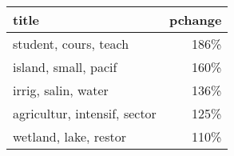 \begin{tabular}{p{1.2cm}r}
\toprule
                        title &  pchange \\
\midrule
        student, cours, teach &     186\% \\
         island, small, pacif &     160\% \\
          irrig, salin, water &     136\% \\
 agricultur, intensif, sector &     125\% \\
        wetland, lake, restor &     110\% \\
\bottomrule
\end{tabular}
